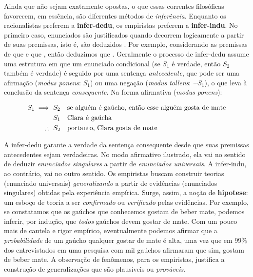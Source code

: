 \documentclass[./main.tex]{subfiles}
\begin{document}
\par Ainda que não sejam exatamente opostas, o que essas correntes filosóficas favorecem, em essência, são diferentes métodos de \textit{inferência}. Enquanto os racionalistas preferem a \textbf{\gls{infer-dedu}}, os empiristas preferem a \textbf{\gls{infer-indu}}. No primeiro caso, enunciados são justificados quando decorrem logicamente a partir de suas premissas, isto é, são deduzidos \cite{laird2010}. Por exemplo, considerando as premissas de que  e que , então deduzimos que . Geralmente o processo de \gls{infer-dedu} assume uma estrutura em que um enunciado condicional (se $S_1$ é verdade, então $S_2$ também é verdade) é seguido por uma sentença \textit{antecedente}, que pode ser uma afirmação (\textit{modus ponens}: $S_1$) ou uma negação (\textit{modus tollens}: $\neg S_1$), o que leva à conclusão da sentença \textit{consequente}. Na forma afirmativa (\textit{modus ponens}):
\begin{linenomath*}
    \begin{align*}
        S_1 \implies S_2 & \quad \textnormal{se alguém é gaúcho, então esse alguém gosta de mate} \\
        S_1 & \quad \textnormal{Clara é gaúcha}\\
        \therefore\;S_2 & \quad \textnormal{portanto, Clara gosta de mate}
    \end{align*}
\end{linenomath*}
A \gls{infer-dedu} garante a verdade da sentença consequente desde que suas premissas antecedentes sejam verdadeiras. No modo afirmativo ilustrado, ela vai no sentido de deduzir \textit{enunciados singulares} a partir de \textit{enunciados universais}. A \gls{infer-indu}, ao contrário, vai no outro sentido. Os empiristas buscam construir teorias (enunciado universais) \textit{generalizando} a partir de evidências (enunciados singulares) obtidas pela experiência empírica. Surge, assim, a noção de \textbf{\gls{hipotese}}: um esboço de \gls{teoria} a ser \textit{confirmado} ou \textit{verificado} pelas evidências. Por exemplo, se constatamos que os gaúchos que conhecemos gostam de beber mate, podemos inferir, por indução, que \textit{todos} gaúchos devem gostar de mate. Com um pouco mais de cautela e rigor empírico, eventualmente podemos afirmar que a \textit{probabilidade} de um gaúcho qualquer gostar de mate é alta, uma vez que em 99\% dos entrevistados em uma pesquisa com mil gaúchos afirmaram que sim, gostam de beber mate. A observação de fenômenos, para os empiristas, justifica a construção de generalizações que são plausíveis ou \textit{prováveis}.
\end{document}
